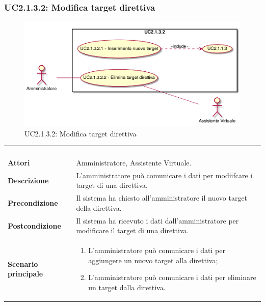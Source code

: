 \newpage\subsubsection{UC2.1.3.2: Modifica target direttiva}
\label{UC2.1.3.2}
\begin{figure}[h]
\centering
\includegraphics[width=\textwidth,height=\textheight,keepaspectratio]{images/UseCaseUC2132.png}
\caption{UC2.1.3.2: Modifica target direttiva}
\end{figure}
\begin{longtable}{l|p{10cm}}
\rowcolor[gray]{0.8} \multicolumn{2}{c}{} \\
\rowcolor[gray]{0.8} \multicolumn{2}{c}{\textbf{UC2.1.3.2 - Modifica target direttiva}} \\
\rowcolor[gray]{0.8} \multicolumn{2}{c}{} \\
\hline
&\\
\textbf{Attori} & Amministratore, Assistente Virtuale.\\[7pt]
\textbf{Descrizione} & L'amministratore può comunicare i dati per modiifcare i target di una direttiva.\\[7pt]
\textbf{Precondizione} & Il sistema ha chiesto all'amministratore il nuovo target della direttiva.\\[7pt]
\textbf{Postcondizione} & Il sistema ha ricevuto i dati dall'amministratore per modificare il target di una direttiva.\\[7pt]
\textbf{Scenario principale} &\begin{enumerate}
\item  L'amministratore può comunicare i dati per aggiungere un nuovo target alla direttiva;
\item  L'amministratore può comunicare i dati per eliminare un target dalla direttiva.
\end{enumerate}
\\[7pt]\hline
\end{longtable}

